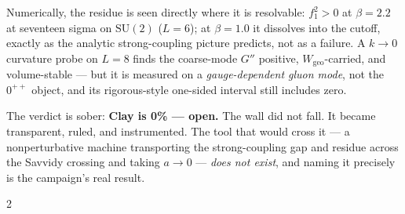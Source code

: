 \documentclass[11pt,a4paper]{article}
\begin{document}
\begin{tcolorbox}[enhanced, breakable, colback=white, colframe=white, boxrule=0pt,
  left=6pt, right=6pt, top=4pt, bottom=4pt, parbox=false]
Numerically, the residue is seen directly where it is resolvable: $f_1^2>0$ at $\beta=2.2$ at
seventeen sigma on $\mathrm{SU}(2)$ ($L=6$); at $\beta=1.0$ it dissolves into the cutoff, exactly
as the analytic strong-coupling picture predicts, not as a failure. A $k\to 0$ curvature probe
on $L=8$ finds the coarse-mode $G''$ positive, $W_{\mathrm{geo}}$-carried, and volume-stable ---
but it is measured on a \emph{gauge-dependent gluon mode}, not the $0^{++}$ object, and its
rigorous-style one-sided interval still includes zero.

The verdict is sober: \textbf{Clay is 0\% --- open.} The wall did not fall. It became transparent,
ruled, and instrumented. The tool that would cross it --- a nonperturbative machine transporting
the strong-coupling gap and residue across the Savvidy crossing and taking $a\to 0$ --- \emph{does
not exist}, and naming it precisely is the campaign's real result.
\end{tcolorbox}

\newpage
\begin{multicols}{2}
{\small\tableofcontents}
\end{multicols}
\newpage








\end{document}
